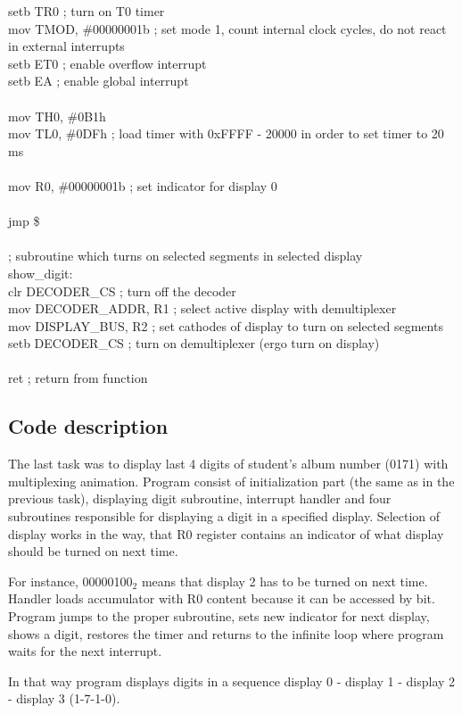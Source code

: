 \documentclass{article}
\begin{document}
    setb    TR0                 ; turn on T0 timer\\
    mov     TMOD, \#00000001b    ; set mode 1, count internal clock cycles, do not react in external interrupts\\
    setb    ET0                 ; enable overflow interrupt\\
    setb    EA                  ; enable global interrupt\\
\\
    mov     TH0, \#0B1h\\
    mov     TL0, \#0DFh          ; load timer with 0xFFFF - 20000 in order to set timer to 20 ms\\
\\
    mov     R0, \#00000001b      ; set indicator for display 0\\
\\
    jmp     \$\\
\\
; subroutine which turns on selected segments in selected display\\
show\_digit:\\
    clr     DECODER\_CS          ; turn off the decoder\\
    mov     DECODER\_ADDR, R1    ; select active display with demultiplexer\\
    mov     DISPLAY\_BUS, R2     ; set cathodes of display to turn on selected segments\\
    setb    DECODER\_CS          ; turn on demultiplexer (ergo turn on display)\\
\\
    ret                         ; return from function

\rmfamily

\newpage

\subsection{Code description}
The last task was to display last 4 digits of student's album number (0171) with multiplexing animation.
Program consist of initialization part (the same as in the previous task), displaying digit subroutine, interrupt handler and 
four subroutines responsible for displaying a digit in a specified display. Selection of display works
in the way, that R0 register contains an indicator of what display should be turned on next time.

For instance, 00000100$_2$ means that display 2 has to be turned on next time. Handler loads accumulator
with R0 content because it can be accessed by bit. Program jumps to the proper subroutine, sets new indicator for next display, shows a digit,
restores the timer and returns to the infinite loop where program waits for the next interrupt.

In that way program displays digits in a sequence display 0 - display 1 - display 2 - display 3 (1-7-1-0).
\end{document}
